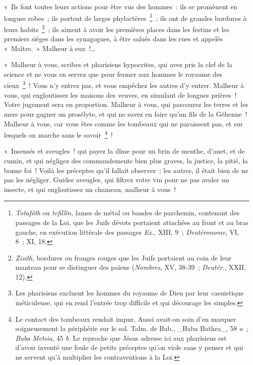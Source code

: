 \documentclass[french,twoside]{book} %
\newenvironment{quoteblock}%
  {\begin{quoting}}
  {\end{quoting}}
\newenvironment{quotebar}{%
    \def\FrameCommand{{\color{rubric!10!}\vrule width 0.5em} \hspace{0.9em}}%
    \def\OuterFrameSep{\itemsep} %
    \MakeFramed {\advance\hsize-\width \FrameRestore}
  }%
  {%
    \endMakeFramed
  }
\renewenvironment{quoteblock}%
  {%
    \savenotes
    \setstretch{0.9}
    \normalfont
    \begin{quotebar}
  }
  {%
    \end{quotebar}
    \spewnotes
  }
\begin{document}
\begin{quoteblock}
 \noindent « Ils font toutes leurs actions pour être vus des hommes : ils se promènent en longues robes ; ils portent de larges phylactères \footnote{{\itshape Totafôth} ou {\itshape tefillîn}, lames de métal ou bandes de parchemin, contenant des passages de la Loi, que les Juifs dévots portaient attachées au front et au bras gauche, en exécution littérale des passages {\itshape Ex.}, XIII, 9 ; {\itshape Deutéronome}, VI, 8 ; XI, 18.} ; ils ont de grandes bordures à leurs habits \footnote{{\itshape Zizith}, bordures ou franges rouges que les Juifs portaient au coin de leur manteau pour se distinguer des païens ({\itshape Nombres}, XV, 38-39 ; {\itshape Deutér.}, XXII, 12).} ; ils aiment à avoir les premières places dans les festins et les premiers sièges dans les synagogues, à être salués dans les rues et appelés « Maître. » Malheur à eux !…\par
 « Malheur à vous, scribes et pharisiens hypocrites, qui avez pris la clef de la science et ne vous en servez que pour fermer aux hommes le royaume des cieux \footnote{Les pharisiens excluent les hommes du royaume de Dieu par leur casuistique méticuleuse, qui en rend l’entrée trop difficile et qui décourage les simples.} ! Vous n’y entrez pas, et vous empêchez les autres d’y entrer. Malheur à vous, qui engloutissez les maisons des veuves, en simulant de longues prières ! Votre jugement sera en proportion. Malheur à vous, qui parcourez les terres et les mers pour gagner un prosélyte, et qui ne savez en faire qu’un fils de la Géhenne ! Malheur à vous, car vous êtes comme les tombeaux qui ne paraissent pas, et sur lesquels on marche sans le savoir \footnote{ Le contact des tombeaux rendait impur. Aussi avait-on soin d’en marquer soigneusement la périphérie sur le sol. Talm. de Bab., \_Baba Bathra\_, 58 {\itshape a ; Baba Metsia}, 45 {\itshape b}. Le reproche que Jésus adresse ici aux pharisiens est d’avoir inventé une foule de petits préceptes qu’on viole sans y penser et qui ne servent qu’à multiplier les contraventions à la Loi.} !\par
 « Insensés et aveugles ! qui payez la dîme pour un brin de menthe, d’anet, et de cumin, et qui négligez des commandements bien plus graves, la justice, la pitié, la bonne foi ! Voilà les préceptes qu’il fallait observer ; les autres, il était bien de ne pas les négliger. Guides aveugles, qui filtrez votre vin pour ne pas avaler un insecte, et qui engloutissez un chameau, malheur à vous !\par

\end{quoteblock}
\end{document}
